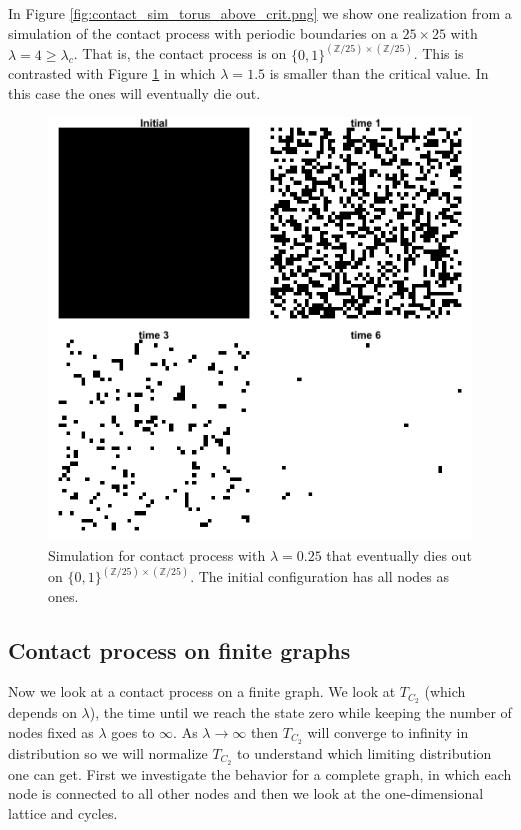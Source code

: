 \documentclass{article}
\theoremstyle{plain}
\theoremstyle{definition}
\theoremstyle{remark}
\numberwithin{equation}{section}
\newcommand{\Z}{\mathbb{Z}}
\begin{document}
In Figure \ref{fig:contact_sim_torus_above_crit.png} we show one realization from a simulation of the contact process with periodic boundaries on a $25 \times 25$ with $\lambda = 4 \geq \lambda_c$.
That is, the contact process is on $\{0,1\}^{(\Z/25) \times (\Z/25)}$.
This is contrasted with Figure \ref{fig:contact_sim_torus_below_crit.png} in which $\lambda = 1.5$ is smaller than the critical value.
In this case the ones will eventually die out.

\begin{figure}[H]
  \centering
    \includegraphics[width=.80\textwidth]{figures/contact_simulation_torus_25_below_crit.png}
   \caption{Simulation for contact process with $\lambda = 0.25$ that eventually dies out on $\{0,1\}^{(\Z/25) \times (\Z/25)}$. The initial configuration has all nodes as ones.}
  \label{fig:contact_sim_torus_below_crit.png}
\end{figure}

\subsection{Contact process on finite graphs}

Now we look at a contact process on a finite graph.
We look at $T_{C_2}$ (which depends on $\lambda$), the time until we reach the state zero while keeping the number of nodes fixed as $\lambda$ goes to $\infty$.
As $\lambda \to \infty$ then $T_{C_2}$ will converge to infinity in distribution so we will normalize $T_{C_2}$ to understand which limiting distribution one can get.
First we investigate the behavior for a complete graph, in which each node is connected to all other nodes and then we look at the one-dimensional lattice and cycles.
\end{document}
